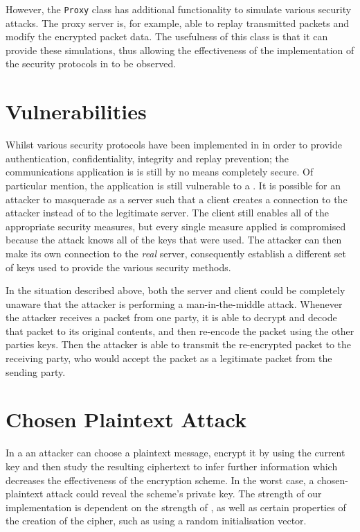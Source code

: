 \documentclass[a4paper,11pt]{article}
\begin{document}
However, the \verb+Proxy+ class has additional functionality to simulate
various security attacks. The proxy server is, for example, able to replay
transmitted packets and modify the encrypted packet data. The usefulness of this
class is that it can provide these simulations, thus allowing the effectiveness
of the implementation of the security protocols in \serviceName{} to be
observed.

\section{Vulnerabilities}
Whilst various security protocols have been implemented in \serviceName{} in
order to provide authentication, confidentiality, integrity and replay
prevention; the communications application is is still by no means completely
secure. Of particular mention, the application is still vulnerable to a
. It is possible for an attacker to
masquerade as a \serviceName{} server such that a client creates a connection to
the attacker instead of to the legitimate server. The client still enables all
of the appropriate security measures, but every single measure applied is
compromised because the attack knows all of the keys that were used. The
attacker can then make its own connection to the \emph{real} \serviceName{}
server, consequently establish a different set of keys used to provide the
various security methods.

In the situation described above, both the server and client could be
completely unaware that the attacker is performing a man-in-the-middle attack.
Whenever the attacker receives a packet from one party, it is able to decrypt
and decode that packet to its original contents, and then re-encode the packet
using the other parties keys. Then the attacker is able to transmit the
re-encrypted packet to the receiving party, who would accept the packet as a
legitimate packet from the sending party.

\section{Chosen Plaintext Attack}
In a  an attacker can choose a plaintext
message, encrypt it by using the current key and then study the resulting
ciphertext to infer further information which decreases the effectiveness of the
encryption scheme. In the worst case, a chosen-plaintext attack could reveal the
scheme's private key. The strength of our \packageName{} implementation is
dependent on the strength of , as well as certain
properties of the creation of the  cipher, such as using a
random initialisation vector.
\end{document}
